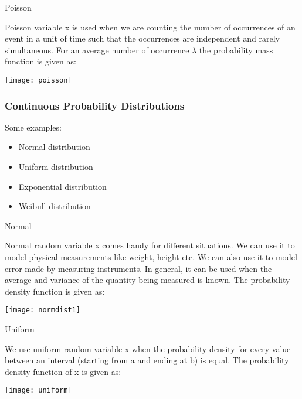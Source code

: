 \begin{frame}{Poisson}

Poisson variable x is used when we are counting the number of
occurrences of an event in a unit of time such that the occurrences are
independent and rarely simultaneous. For an average number of
occurrence $\lambda$ the probability mass function is given as:
\begin{center}
\texttt{[image: poisson]}
\end{center}
\end{frame}


\begin{frame}
\frametitle{Continuous Probability Distributions }
Some examples:
\begin{itemize}
\item  Normal distribution 
 
\item  Uniform distribution 
 
\item  Exponential distribution 
 
\item  Weibull distribution 
 
\end{itemize}
\end{frame}

\begin{frame}{Normal}

Normal random variable x comes handy for different situations. We can
use it to model physical measurements like weight, height etc. We can
also use it to model error made by measuring instruments. In general, it
can be used when the average and variance of the quantity being
measured is known. The probability density function is given as:
\begin{center}
\texttt{[image: normdist1]}
\end{center}
\end{frame}

\begin{frame}{Uniform}

We use uniform random variable x when the probability density for
every value between an interval (starting from a and ending at b) is
equal. The probability density function of x is given as:
\begin{center}
\texttt{[image: uniform]}
\end{center}
\end{frame}

